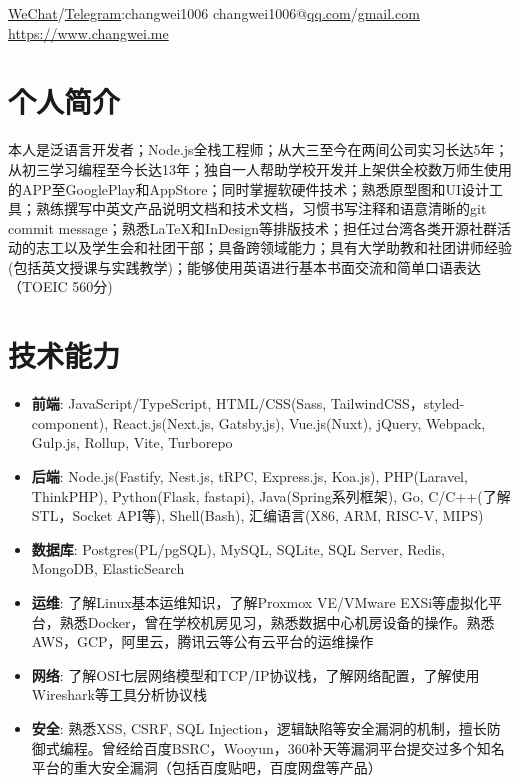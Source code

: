 \documentclass{resume}
\newcommand{\iconsection}[2]{
    \section[\texorpdfstring{#2}{#2}]{\faIcon{#1}\quad #2}
}
\begin{document}
    \sloppy


    \contactInfo
    {\href{https://www.changwei.me/_next/static/media/wechat_changwei1006.bb2a1d9a.jpg}{WeChat}/\href{https://t.me/changwei1006}{Telegram}:changwei1006}
    {{changwei1006@}\href{mailto:changwei1006@qq.com}{qq.com}/\href{mailto:changwei1006@gmail.com}{gmail.com}}
    {\href{https://www.changwei.me}{https://www.changwei.me}}{}

    \iconsection{user}{个人简介}
    本人是泛语言开发者；Node.js全栈工程师；从大三至今在两间公司实习长达5年；从初三学习编程至今长达13年；独自一人帮助学校开发并上架供全校数万师生使用的APP至GooglePlay和AppStore；同时掌握软硬件技术；熟悉原型图和UI设计工具；熟练撰写中英文产品说明文档和技术文档，习惯书写注释和语意清晰的git commit message；熟悉\LaTeX 和InDesign等排版技术；担任过台湾各类开源社群活动的志工以及学生会和社团干部；具备跨领域能力；具有大学助教和社团讲师经验(包括英文授课与实践教学)；能够使用英语进行基本书面交流和简单口语表达（TOEIC 560分)

    \iconsection{wrench}{技术能力}
        \begin{itemize}
            \item \textbf{前端}: JavaScript/TypeScript, HTML/CSS(Sass, TailwindCSS，styled-component), React.js(Next.js, Gatsby,js), Vue.js(Nuxt), jQuery, Webpack, Gulp.js, Rollup, Vite, Turborepo
            \item \textbf{后端}: Node.js(Fastify, Nest.js, tRPC, Express.js, Koa.js), PHP(Laravel, ThinkPHP), Python(Flask, fastapi), Java(Spring系列框架), Go, C/C++(了解STL，Socket API等), Shell(Bash), 汇编语言(X86, ARM, RISC-V, MIPS)
            \item \textbf{数据库}: Postgres(PL/pgSQL), MySQL, SQLite, SQL Server, Redis, MongoDB, ElasticSearch
            \item \textbf{运维}: 了解Linux基本运维知识，了解Proxmox VE/VMware EXSi等虚拟化平台，熟悉Docker，曾在学校机房见习，熟悉数据中心机房设备的操作。熟悉AWS，GCP，阿里云，腾讯云等公有云平台的运维操作
            \item \textbf{网络}: 了解OSI七层网络模型和TCP/IP协议栈，了解网络配置，了解使用Wireshark等工具分析协议栈
            \item \textbf{安全}: 熟悉XSS, CSRF, SQL Injection，逻辑缺陷等安全漏洞的机制，擅长防御式编程。曾经给百度BSRC，Wooyun，360补天等漏洞平台提交过多个知名平台的重大安全漏洞（包括百度贴吧，百度网盘等产品）
        \end{itemize}
\end{document}
